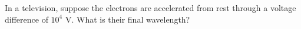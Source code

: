 In a television, suppose the electrons are accelerated
from rest through a voltage difference of $10^4$ V.  What
is their final wavelength?\answercheck

